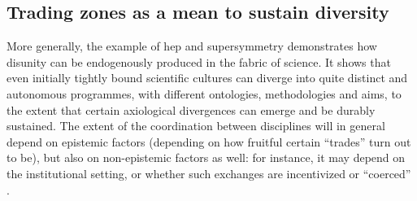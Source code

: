 \documentclass[smallextended]{svjour3}
\begin{document}

\subsection{Trading zones as a mean to sustain diversity}

More generally, the example of \gls{hep} and supersymmetry demonstrates how disunity can be endogenously produced in the fabric of science. It shows that even initially tightly bound scientific cultures can diverge into quite distinct and autonomous programmes, with different ontologies, methodologies and aims, to the extent that certain axiological divergences can emerge and be durably sustained. The extent of the coordination between disciplines will in general depend on epistemic factors (depending on how fruitful certain ``trades'' turn out to be), but also on non-epistemic factors as well: for instance, it may depend on the institutional setting, or whether such exchanges are incentivized or ``coerced'' \citep{gorman2010trading}.
\end{document}

